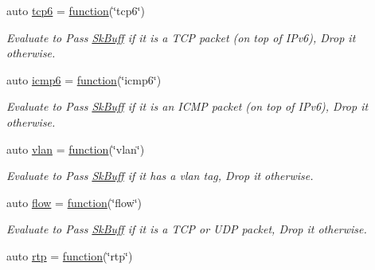 \begin{DoxyCompactItemize}
auto \hyperlink{namespacepfq_1_1lang_1_1anonymous__namespace_02default_8hpp_03_ad5806a9b77c5975d08f0d0d317faa7a0}{tcp6} = \hyperlink{namespacepfq_1_1lang_a1a4638059d700ae08d0ca63886ff2bb3}{function}(\char`\"{}tcp6\char`\"{})
\begin{DoxyCompactList}\small\item\em Evaluate to {\ttfamily Pass} \hyperlink{structpfq_1_1lang_1_1SkBuff}{Sk\+Buff} if it is a T\+CP packet (on top of I\+Pv6), {\ttfamily Drop} it otherwise. \end{DoxyCompactList}\item 
auto \hyperlink{namespacepfq_1_1lang_1_1anonymous__namespace_02default_8hpp_03_a8fda9498af823eec4f9f8d81d4a171d5}{icmp6} = \hyperlink{namespacepfq_1_1lang_a1a4638059d700ae08d0ca63886ff2bb3}{function}(\char`\"{}icmp6\char`\"{})
\begin{DoxyCompactList}\small\item\em Evaluate to {\ttfamily Pass} \hyperlink{structpfq_1_1lang_1_1SkBuff}{Sk\+Buff} if it is an I\+C\+MP packet (on top of I\+Pv6), {\ttfamily Drop} it otherwise. \end{DoxyCompactList}\item 
auto \hyperlink{namespacepfq_1_1lang_1_1anonymous__namespace_02default_8hpp_03_a747e907a678ad69c5bfdd3048a239b6a}{vlan} = \hyperlink{namespacepfq_1_1lang_a1a4638059d700ae08d0ca63886ff2bb3}{function}(\char`\"{}vlan\char`\"{})
\begin{DoxyCompactList}\small\item\em Evaluate to {\ttfamily Pass} \hyperlink{structpfq_1_1lang_1_1SkBuff}{Sk\+Buff} if it has a vlan tag, {\ttfamily Drop} it otherwise. \end{DoxyCompactList}\item 
auto \hyperlink{namespacepfq_1_1lang_1_1anonymous__namespace_02default_8hpp_03_af6c7518847c8c960b0e98cd856871a1b}{flow} = \hyperlink{namespacepfq_1_1lang_a1a4638059d700ae08d0ca63886ff2bb3}{function}(\char`\"{}flow\char`\"{})
\begin{DoxyCompactList}\small\item\em Evaluate to {\ttfamily Pass} \hyperlink{structpfq_1_1lang_1_1SkBuff}{Sk\+Buff} if it is a T\+CP or U\+DP packet, {\ttfamily Drop} it otherwise. \end{DoxyCompactList}\item 
auto \hyperlink{namespacepfq_1_1lang_1_1anonymous__namespace_02default_8hpp_03_aa8ac230fe8eeb0bccee8e31ba032cb8e}{rtp} = \hyperlink{namespacepfq_1_1lang_a1a4638059d700ae08d0ca63886ff2bb3}{function}(\char`\"{}rtp\char`\"{})

\end{DoxyCompactItemize}
